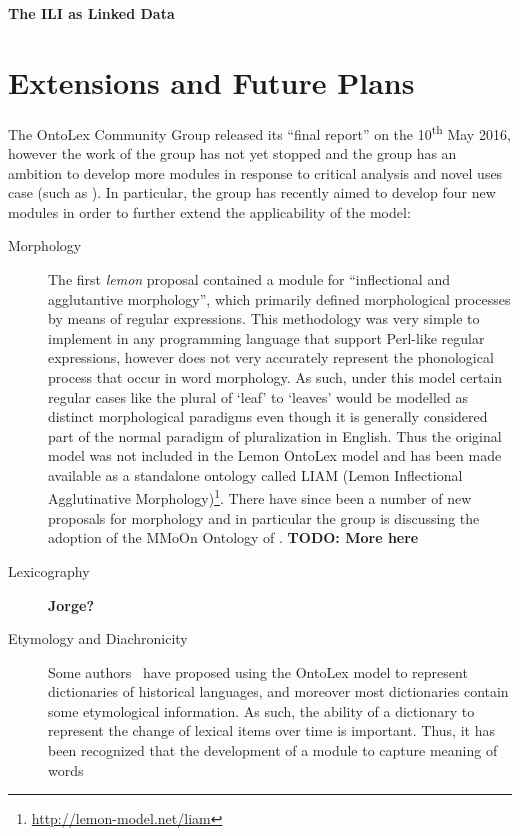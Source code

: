 \documentclass[12pt,a4paper]{elex2017}
\begin{document}
\textbf{The ILI as Linked Data}

\section{Extensions and Future Plans}

The OntoLex Community Group released its ``final report'' on the
10\textsuperscript{th} May 2016,
however the work of the group has not yet stopped and the group has an ambition
to develop more modules in response to critical analysis and novel uses case
(such as \cite{chavula2014lemon}). In particular, the group has recently aimed
to develop four new modules in order to further extend the applicability of the
model:

\begin{description}
    \item[Morphology] The first \emph{lemon} proposal contained a module for
        ``inflectional and agglutantive morphology'', which primarily defined
        morphological processes by means of regular expressions. This
        methodology was very simple to implement in any programming language
        that support Perl-like regular expressions, however does not very
        accurately represent the phonological process that occur in word
        morphology. As such, under this model certain regular cases like the
        plural of `leaf' to `leaves' would be modelled as distinct morphological
        paradigms even though it is generally considered part of the normal paradigm of
        pluralization in English. Thus the original model was not included in
        the Lemon OntoLex model and has been made available as
        a standalone ontology called LIAM (Lemon Inflectional Agglutinative
        Morphology)\footnote{\url{http://lemon-model.net/liam}}. There have
        since been a number of new proposals for morphology and in particular
        the group is discussing the adoption of the MMoOn Ontology of
        \citep{MMoOn_heb}. \textbf{TODO: More here}
    \item[Lexicography] \textbf{Jorge?}
    \item[Etymology and Diachronicity] Some authors~\citep{khan2014using,abromeit2016linking} have
        proposed using the OntoLex model to represent dictionaries of historical
        languages, and moreover most dictionaries contain some etymological
        information. As such, the ability of a dictionary to represent the
        change of lexical items over time is important. Thus, it has been
        recognized that the development of a module to capture meaning of words

\end{description}
\end{document}
